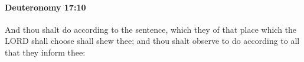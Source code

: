
		\paragraph{Deuteronomy 17:10} %
			\label{DEUTERONOMY-17-10}

			And thou shalt do according to the sentence, which they of that place which the LORD shall choose shall shew thee; and thou shalt observe to do according to all that they inform thee:


